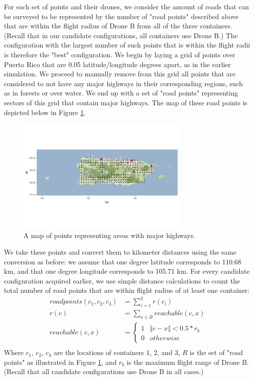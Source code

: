 For each set of points and their drones, we consider the amount of roads that can be surveyed to be represented by the number of "road points" described above that are within the flight radius of Drone B from all of the three containers. (Recall that in our candidate configurations, all containers use Drone B.) The configuration with the largest number of such points that is within the flight radii is therefore the "best" configuration.  We begin by laying a grid of points over Puerto Rico that are 0.05 latitude/longitude degrees apart, as in the earlier simulation. We proceed to manually remove from this grid all points that are considered to not have any major highways in their corresponding regions, such as in forests or over water. We end up with a set of "road points" representing sectors of this grid that contain major highways. The map of these road points is depicted below in Figure \ref{fig:roadpoints_map}.

\begin{figure}[h]
    \centering
    \includegraphics[width=0.75\textwidth]{roadpoints.png}
    \caption{A map of points representing areas with major highways.}
    \label{fig:roadpoints_map}
\end{figure}

We take these points and convert them to kilometer distances using the same conversion as before: we assume that one degree latitude corresponds to 110.68 km, and that one degree longitude corresponds to 105.71 km. For every candidate configuration acquired earlier, we use simple distance calculations to count the total number of road points that are within flight radius of at least one container:
\begin{align*}
    roadpoints(c_1, c_2, c_3) &= \sum_{i=1}^{3} r(c_i) \\
    r(c) &= \sum_{x \in R} reachable(c, x) \\
    reachable(c, x) &= 
    \begin{cases}
        1 & \Vert c -x\Vert < 0.5 * r_b \\
        0 & otherwise
    \end{cases} \\
\end {align*}
Where $c_1$, $c_2$, $c_3$ are the locations of containers 1, 2, and 3, $R$ is the set of "road points" as illustrated in Figure \ref{fig:roadpoints_map}, and $r_b$ is the maximum flight range of Drone B. (Recall that all candidate configurations use Drone B in all cases.)  


